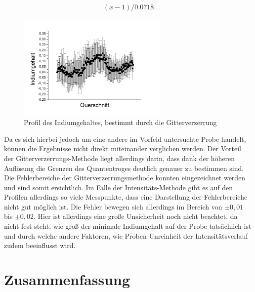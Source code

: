 \documentclass[a4paper,11pt,DIV=11]{scrartcl}
\begin{document}
\begin{align*}
	(x-1) / 0.0718
\end{align*}

\begin{figure}[H]\centering
	\includegraphics[width=0.65\textwidth]{Versuchsdaten/13/Graph01.png}
\caption{Profil des Indiumgehaltes, bestimmt durch die Gitterverzerrung}
\label{hochindium}
\end{figure}

Da es sich hierbei jedoch um eine andere im Vorfeld untersuchte Probe handelt, können die Ergebnisse nicht direkt miteinander verglichen werden. Der Vorteil der Gitterverzerrungs-Methode liegt allerdings darin, dass dank der höheren Auflösung die Grenzen des Quantentroges deutlich genauer zu bestimmen sind. \\
Die Fehlerbereiche der Gitterverzerrungsmethode konnten eingezeichnet werden und sind somit ersichtlich. Im Falle der Intensitäts-Methode gibt es auf den Profilen allerdings so viele Messpunkte, dass eine Darstellung der Fehlerbereiche nicht gut möglich ist. Die Fehler bewegen sich allerdings im Bereich von $\pm0,01$ bis $\pm0,02$. Hier ist allerdings eine große Unsicherheit noch nicht beachtet, da nicht fest steht, wie groß der minimale Indiumgehalt auf der Probe tatsächlich ist und durch welche andere Faktoren, wie Proben Unreinheit der Intensitätsverlauf zudem beeinflusst wird.


\section{Zusammenfassung}
\end{document}
